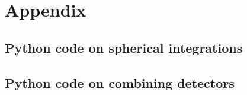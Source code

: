 \chapter{Appendix}
\section{Python code on spherical integrations}
\section{Python code on combining detectors}